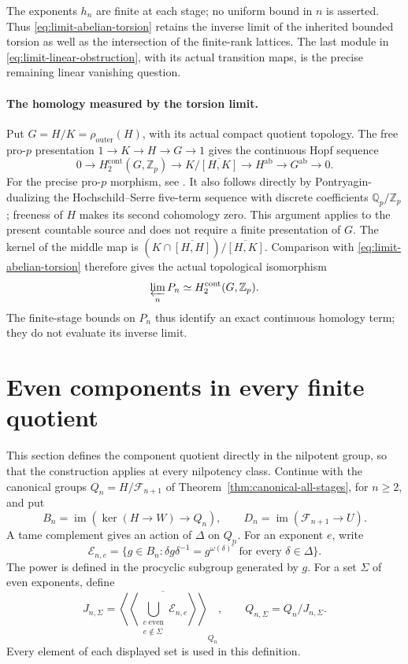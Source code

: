 \documentclass[11pt]{article}
\theoremstyle{definition}\newtheorem{definition}[theorem]{Definition}
\begin{document}
The exponents \(h_n\) are finite at each stage; no uniform
bound in \(n\) is asserted. Thus
\eqref{eq:limit-abelian-torsion} retains the inverse limit
of the inherited bounded torsion as well as the intersection
of the finite-rank lattices. The last module in
\eqref{eq:limit-linear-obstruction}, with its actual
transition maps, is the precise remaining linear
vanishing question.

\paragraph{The homology measured by the torsion limit.}
Put \(G=H/K=\rho_{\mathrm{outer}}(H)\), with its actual compact
quotient topology. The free pro-\(p\) presentation
\(1\to K\to H\to G\to1\) gives the continuous Hopf sequence
\[
0\longrightarrow H_2^{\mathrm{cont}}(G,\mathbb Z_p)
\longrightarrow K/\overline{[H,K]}
\longrightarrow H^{\mathrm{ab}}
\longrightarrow G^{\mathrm{ab}}\longrightarrow0.
\]
For the precise pro-\(p\) morphism, see
\cite[Proposition~2.2, author p.~3, and the Hopf formula on
author p.~4]{Moravec2011}. It also follows directly by
Pontryagin-dualizing the Hochschild--Serre five-term sequence
with discrete coefficients \(\mathbb Q_p/\mathbb Z_p\);
freeness of \(H\) makes its second cohomology zero.
This argument applies to the present countable source and
does not require a finite presentation of \(G\).
The kernel of the middle map is
\((K\cap\overline{[H,H]})/\overline{[H,K]}\).
Comparison with \eqref{eq:limit-abelian-torsion} therefore gives
the actual topological isomorphism
\[
 \varprojlim_nP_n
       \simeq H_2^{\mathrm{cont}}(G,\mathbb Z_p).
\]
The finite-stage bounds on \(P_n\) thus identify an exact
continuous homology term; they do not evaluate its inverse
limit.


\section{Even components in every finite quotient}
\label{sec:selected-all-stages}

This section defines the component quotient directly in the
nilpotent group, so that the construction applies at every
nilpotency class. Continue with the canonical groups
\(Q_n=H/\mathcal F_{n+1}\) of Theorem~\ref{thm:canonical-all-stages},
for \(n\geq2\), and put
\[
 B_n=\operatorname{im}(\ker(H\longrightarrow W)\longrightarrow Q_n),
 \qquad D_n=\operatorname{im}(\mathcal F_{n+1}\longrightarrow U).
\]
A tame complement gives an action of \(\Delta\) on \(Q_n\).
For an exponent \(e\), write
\[
 \mathcal E_{n,e}=
 \{g\in B_n:\delta g\delta^{-1}=g^{\omega(\delta)^e}
                         \text{ for every }\delta\in\Delta\}.
\]
The power is defined in the procyclic subgroup generated by \(g\).
For a set \(\Sigma\) of even exponents, define
\[
 J_{n,\Sigma}=
 \overline{\left\langle\!\left\langle
       \bigcup_{\substack{e\ \mathrm{even}\\e\notin\Sigma}}
                   \mathcal E_{n,e}
                   \right\rangle\!\right\rangle}_{Q_n},
 \qquad Q_{n,\Sigma}=Q_n/J_{n,\Sigma}.
\]
Every element of each displayed set is used in this definition.
\end{document}
